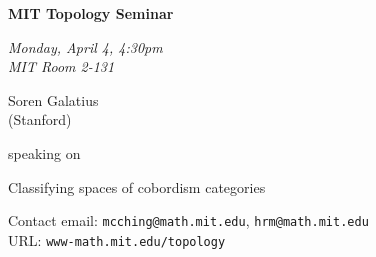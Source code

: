 \documentclass{slides}
\begin{document}
\begin{center}

{\fontsize {44pt}{28pt}\selectfont

\textrm{
{\textbf{MIT Topology Seminar}}}
}
\medskip


{\large\textrm{\emph{Monday, April 4, 4:30pm\\MIT Room 2-131}}}



\medskip

\textrm{{\LARGE Soren Galatius  \\[.5cm](Stanford)}}

\bigskip
\textrm{speaking on}
\bigskip

\textrm{\LARGE Classifying spaces of cobordism categories}\\

\end{center}



{\small


\vspace{1cm}

\textrm{Contact email: } \texttt{mcching@math.mit.edu}, \texttt{hrm@math.mit.edu}\\
\textrm{URL: } \texttt{www-math.mit.edu/topology}
}
\end{document}
